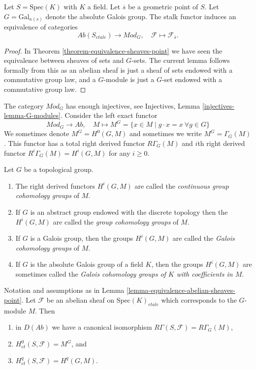 \begin{lemma}
\label{lemma-equivalence-abelian-sheaves-point}
Let $S = \text{Spec}(K)$ with $K$ a field.
Let $\overline{s}$ be a geometric point of $S$.
Let $G = \text{Gal}_{\kappa(s)}$ denote the absolute Galois group.
The stalk functor induces an equivalence of categories
$$
\textit{Ab}(S_{etale}) \longrightarrow \textit{Mod}_G,
\quad
\mathcal{F} \longmapsto \mathcal{F}_{\overline{s}}.
$$
\end{lemma}

\begin{proof}
In
Theorem \ref{theorem-equivalence-sheaves-point}
we have seen the equivalence between sheaves of sets and $G$-sets.
The current lemma follows formally from this as an abelian sheaf is just
a sheaf of sets endowed with a commutative group law, and a $G$-module
is just a $G$-set endowed with a commutative group law.
\end{proof}

\noindent
The category $\textit{Mod}_G$ has enough injectives, see
Injectives, Lemma \ref{injectives-lemma-G-modules}.
Consider the left exact functor
$$
\textit{Mod}_G \longrightarrow \textit{Ab},
\quad
M \longmapsto M^G =
\{x \in M \mid g \cdot x = x\ \forall g \in G\}
$$
We sometimes denote $M^G = H^0(G, M)$ and sometimes we write
$M^G = \Gamma_G(M)$. This functor has a total right derived functor
$R\Gamma_G(M)$ and $i$th right derived functor
$R^i\Gamma_G(M) = H^i(G, M)$ for any $i \geq 0$.

\begin{definition}
\label{definition-galois-cohomology}
Let $G$ be a topological group.
\begin{enumerate}
\item The right derived functors $H^i(G, M)$ are called the
{\it continuous group cohomology groups} of $M$.
\item If $G$ is an abstract group endowed with the discrete topology
then the $H^i(G, M)$ are called the {\it group cohomology groups} of $M$.
\item If $G$ is a Galois group, then the groups $H^i(G, M)$ are called
the {\it Galois cohomology groups} of $M$.
\item If $G$ is the absolute Galois group of a field $K$, then the groups
$H^i(G, M)$ are sometimes called the {\it Galois cohomology groups of $K$
with coefficients in $M$}.
\end{enumerate}
\end{definition}

\begin{lemma}
\label{lemma-compare-cohomology-point}
Notation and assumptions as in
Lemma \ref{lemma-equivalence-abelian-sheaves-point}.
Let $\mathcal{F}$ be an abelian sheaf on $\text{Spec}(K)_{etale}$
which corresponds to the $G$-module $M$.
Then
\begin{enumerate}
\item in $D(\textit{Ab})$ we have a canonical isomorphism
$R\Gamma(S, \mathcal{F}) = R\Gamma_G(M)$,
\item $H_{et}^0(S, \mathcal{F}) = M^G$, and
\item $H_{et}^q(S, \mathcal{F}) = H^q(G, M)$.
\end{enumerate}
\end{lemma}

